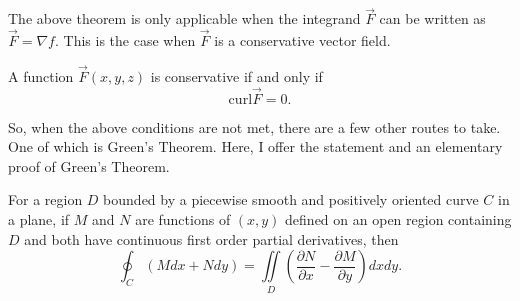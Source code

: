 \begin{remark}
    The above theorem is only applicable when the integrand $\vec{F}$ can be written as $\vec{F} = \nabla f$. This is the case when $\vec{F}$ is a conservative vector field.
\end{remark}

\begin{proposition}
    A function $\vec{F}(x, y, z)$ is conservative if and only if
    \[\mathrm{curl}\vec{F} = 0.\]
\end{proposition}

So, when the above conditions are not met, there are a few other routes to take. One of which is Green's Theorem. Here, I offer the statement and an elementary proof of Green's Theorem.

\begin{theorem}
    For a region $D$ bounded by a piecewise smooth and positively oriented curve $C$ in a plane, if $M$ and $N$ are functions of $(x, y)$ defined on an open region containing $D$ and both have continuous first order partial derivatives, then
    \[\oint_{C}(Mdx + Ndy) = \iint\limits_{D}\left(\frac{\partial N}{\partial x} - \frac{\partial M}{\partial y}\right)dxdy.\]
\end{theorem}

